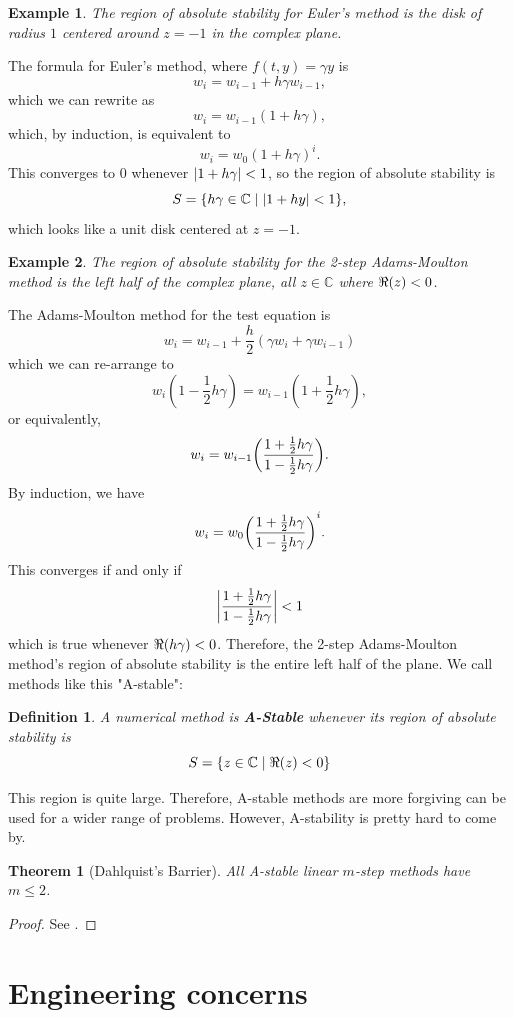 \documentclass{article}
\newtheorem{definition}{Definition}[section]
\newtheorem{theorem}{Theorem}[section]
\newtheorem{example}{Example}[section]
\newcommand{\C}{\mathbb{C}}
\newcommand{\0}{\vb{0}}
\begin{document}
\begin{example}
  The region of absolute stability for Euler's method is the disk of radius $1$ centered around $z = -1$ in the complex plane.
\end{example}
The formula for Euler's method, where $f(t, y) = \gamma y$ is 
\[w_i = w_{i-1} + h\gamma w_{i-1},\]
which we can rewrite as
\[w_i = w_{i-1}(1 + h\gamma),\]
which, by induction, is equivalent to
\[w_i = w_{0}(1 + h\gamma)^i.\]
This converges to $0$ whenever $\qty|1+h\gamma| < 1$, so the region of absolute stability is
\[S = \qty{h\gamma \in \C\mid\qty|1+hy| < 1},\]
which looks like a unit disk centered at $z = -1$.

\begin{example}
  The region of absolute stability for the 2-step Adams-Moulton method is the left half of the complex plane, all $z \in \C$ where $\real(z) < 0$.
\end{example}
The Adams-Moulton method for the test equation is
\[w_i = w_{i-1} + \frac{h}{2}(\gamma w_i + \gamma w_{i-1})\]
which we can re-arrange to
\[w_i(1-\frac{1}{2}h\gamma) = w_{i-1}(1+\frac{1}{2}h\gamma),\]
or equivalently,
\[w_i = w_{i-1}\qty(\frac{1+\frac{1}{2}h\gamma}{1-\frac{1}{2}h\gamma}).\]
By induction, we have
\[w_i = w_{0}\qty(\frac{1+\frac{1}{2}h\gamma}{1-\frac{1}{2}h\gamma})^i.\]
This converges if and only if
\[\qty|\frac{1+\frac{1}{2}h\gamma}{1-\frac{1}{2}h\gamma}| < 1\]
which is true whenever $\real(h\gamma) < 0$. Therefore, the 2-step Adams-Moulton method's region of absolute stability is the entire left half of the plane. We call methods like this "A-stable":
\begin{definition}
  A numerical method is \textbf{A-Stable} whenever its region of absolute stability is
  \[S = \qty{z\in\C\mid\real(z) < 0}\]
\end{definition}
This region is quite large. Therefore, A-stable methods are more forgiving can be used for a wider range of problems. However, A-stability is pretty hard to come by.
\begin{theorem}[Dahlquist's Barrier]
  All A-stable linear $m$-step methods have $m \leq 2$.
\end{theorem}
\begin{proof}
  See \cite{dahlquist1956}.
\end{proof}

\section{Engineering concerns}
\end{document}
